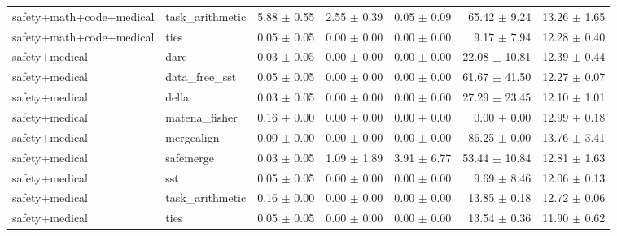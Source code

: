 \begin{table}[H]
{\begin{tabular}{llrrrrr}
safety+math+code+medical & task\_arithmetic & 5.88 $\pm$ 0.55 & 2.55 $\pm$ 0.39 & 0.05 $\pm$ 0.09 & 65.42 $\pm$ 9.24 & 13.26 $\pm$ 1.65 \\
safety+math+code+medical & ties & 0.05 $\pm$ 0.05 & 0.00 $\pm$ 0.00 & 0.00 $\pm$ 0.00 & 9.17 $\pm$ 7.94 & 12.28 $\pm$ 0.40 \\
safety+medical & dare & 0.03 $\pm$ 0.05 & 0.00 $\pm$ 0.00 & 0.00 $\pm$ 0.00 & 22.08 $\pm$ 10.81 & 12.39 $\pm$ 0.44 \\
safety+medical & data\_free\_sst & 0.05 $\pm$ 0.05 & 0.00 $\pm$ 0.00 & 0.00 $\pm$ 0.00 & 61.67 $\pm$ 41.50 & 12.27 $\pm$ 0.07 \\
safety+medical & della & 0.03 $\pm$ 0.05 & 0.00 $\pm$ 0.00 & 0.00 $\pm$ 0.00 & 27.29 $\pm$ 23.45 & 12.10 $\pm$ 1.01 \\
safety+medical & matena\_fisher & 0.16 $\pm$ 0.00 & 0.00 $\pm$ 0.00 & 0.00 $\pm$ 0.00 & 0.00 $\pm$ 0.00 & 12.99 $\pm$ 0.18 \\
safety+medical & mergealign & 0.00 $\pm$ 0.00 & 0.00 $\pm$ 0.00 & 0.00 $\pm$ 0.00 & 86.25 $\pm$ 0.00 & 13.76 $\pm$ 3.41 \\
safety+medical & safemerge & 0.03 $\pm$ 0.05 & 1.09 $\pm$ 1.89 & 3.91 $\pm$ 6.77 & 53.44 $\pm$ 10.84 & 12.81 $\pm$ 1.63 \\
safety+medical & sst & 0.05 $\pm$ 0.05 & 0.00 $\pm$ 0.00 & 0.00 $\pm$ 0.00 & 9.69 $\pm$ 8.46 & 12.06 $\pm$ 0.13 \\
safety+medical & task\_arithmetic & 0.16 $\pm$ 0.00 & 0.00 $\pm$ 0.00 & 0.00 $\pm$ 0.00 & 13.85 $\pm$ 0.18 & 12.72 $\pm$ 0.06 \\
safety+medical & ties & 0.05 $\pm$ 0.05 & 0.00 $\pm$ 0.00 & 0.00 $\pm$ 0.00 & 13.54 $\pm$ 0.36 & 11.90 $\pm$ 0.62 \\
\bottomrule
\end{tabular}
}
\end{table}